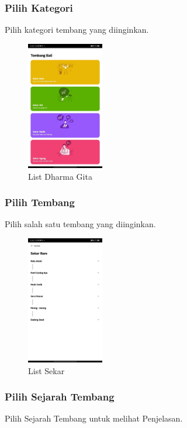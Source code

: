 \documentclass[a4paper, 12pt]{article}
\begin{document}
\subsubsection{Pilih Kategori}
Pilih kategori tembang yang diinginkan.

\begin{figure}[H]
    \centering
    \includegraphics[width=0.3\textwidth]{assets/list-gita.jpg}
    \caption{List Dharma Gita}
\end{figure}

\subsubsection{Pilih Tembang}
Pilih salah satu tembang yang diinginkan.

\begin{figure}[H]
    \centering
    \includegraphics[width=0.3\textwidth]{assets/list-rare.jpg}
    \caption{List Sekar}
\end{figure}

\subsubsection{Pilih Sejarah Tembang}
Pilih Sejarah Tembang untuk melihat Penjelasan.
\end{document}

